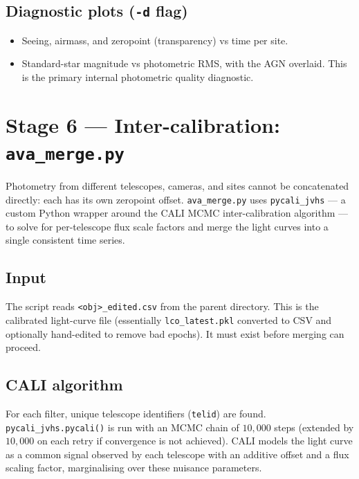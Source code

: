 \documentclass[12pt,a4paper]{article}
\begin{document}
\subsection{Diagnostic plots (\texttt{-d} flag)}

\begin{itemize}[noitemsep]
  \item Seeing, airmass, and zeropoint (transparency) vs time per site.
  \item Standard-star magnitude vs photometric RMS, with the AGN overlaid.  This is the
        primary internal photometric quality diagnostic.
\end{itemize}

\section{Stage 6 --- Inter-calibration: \texttt{ava\_merge.py}}
\label{sec:merge}

Photometry from different telescopes, cameras, and sites cannot be concatenated directly:
each has its own zeropoint offset.  \texttt{ava\_merge.py} uses
\texttt{pycali\_jvhs} --- a custom Python wrapper around the CALI MCMC
inter-calibration algorithm --- to solve for per-telescope flux scale factors and merge
the light curves into a single consistent time series.

\subsection{Input}

The script reads \texttt{<obj>\_edited.csv} from the parent directory.  This is the
calibrated light-curve file (essentially \texttt{lco\_latest.pkl} converted to CSV and
optionally hand-edited to remove bad epochs).  It must exist before merging can proceed.

\subsection{CALI algorithm}

For each filter, unique telescope identifiers (\texttt{telid}) are found.
\texttt{pycali\_jvhs.pycali()} is run with an MCMC chain of $10{,}000$ steps (extended
by $10{,}000$ on each retry if convergence is not achieved).  CALI models the light curve
as a common signal observed by each telescope with an additive offset and a flux scaling
factor, marginalising over these nuisance parameters.
\end{document}
